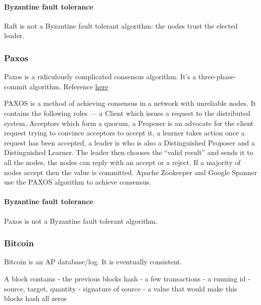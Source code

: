 \hypertarget{byzantine-fault-tolerance}{%
\paragraph{Byzantine fault tolerance}\label{byzantine-fault-tolerance}}

Raft is not a Byzantine fault tolerant algorithm: the nodes trust the
elected leader.

\hypertarget{paxos}{%
\subsubsection{Paxos}\label{paxos}}

Paxos is a ridiculously complicated consensus algorithm. It's a
three-phase-commit algorithm. Reference
\href{http://lamport.azurewebsites.net/pubs/pubs.html\#lamport-paxos}{here}

PAXOS is a method of achieving consensus in a network with unreliable
nodes. It contains the following roles --- a Client which issues a
request to the distributed system, Acceptors which form a quorum, a
Proposer is an advocate for the client request trying to convince
acceptors to accept it, a learner takes action once a request has been
accepted, a leader is who is also a Distinguished Proposer and a
Distinguished Learner. The leader then chooses the ``valid result'' and
sends it to all the nodes, the nodes can reply with an accept or a
reject. If a majority of nodes accept then the value is committed.
Apache Zookeeper and Google Spanner use the PAXOS algorithm to achieve
consensus.

\hypertarget{byzantine-fault-tolerance-1}{%
\paragraph{Byzantine fault
tolerance}\label{byzantine-fault-tolerance-1}}

Paxos is not a Byzantine fault tolerant algorithm.

\hypertarget{bitcoin}{%
\subsubsection{Bitcoin}\label{bitcoin}}

Bitcoin is an AP database/log. It is eventually consistent.

A block contains - the previous blocks hash - a few transactions - a
running id - source, target, quantity - signature of source - a value
that would make this blocks hash all zeros

